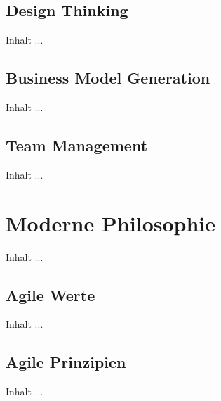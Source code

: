 \subsection{Design Thinking}
Inhalt ...

\subsection{Business Model Generation}
Inhalt ...

\subsection{Team Management}
Inhalt ...



\section{Moderne Philosophie}
Inhalt ...

\subsection{Agile Werte}
Inhalt ...

\subsection{Agile Prinzipien}
Inhalt ...
